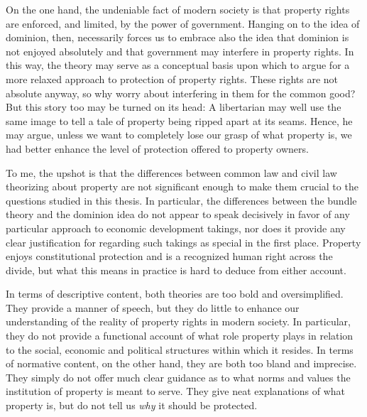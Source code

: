On the one hand, the undeniable fact of modern society is that property rights are enforced, and limited, by the power of government. Hanging on to the idea of dominion, then, necessarily forces us to embrace also the idea that dominion is not enjoyed absolutely and that government may interfere in property rights. In this way, the theory may serve as a conceptual basis upon which to argue for a more relaxed approach to protection of property rights. These rights are not absolute anyway, so why worry about interfering in them for the common good? But this story too may be turned on its head: A libertarian may well use the same image to tell a tale of property being ripped apart at its seams. Hence, he may argue, unless we want to completely lose our grasp of what property is, we had better enhance the level of protection offered to property owners.

To me, the upshot is that the differences between common law and civil law theorizing about property are not significant enough to 
make them crucial to the questions studied in this thesis. In particular, the differences between the bundle theory and the dominion idea do not appear to speak decisively in favor of any particular approach to economic development takings, nor does it provide any clear justification for regarding such takings as special in the first place. Property enjoys constitutional protection and is a recognized human right across the divide, but what this means in practice is hard to deduce from either account.

In terms of descriptive content, both theories are too bold and oversimplified. They provide a manner of speech, but they do little to enhance our understanding of the reality of property rights in modern society. In particular, they do not provide a functional account of what role property plays in relation to the social, economic and political structures within which it resides. In terms of normative content, on the other hand, they are both too bland and imprecise. They simply do not offer much clear guidance as to what norms and values the institution of property is meant to serve. They give neat explanations of what property is, but do not tell us {\it why} it should be protected. 

